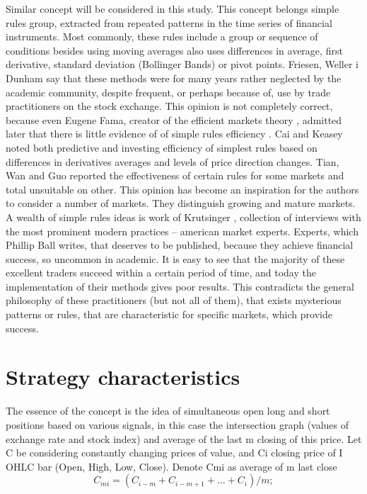 \documentclass{tewiart}
\begin{document}
Similar concept will be considered in this study. This concept belongs simple rules group, extracted from repeated patterns in the time series of financial instruments. Most commonly, these rules include a group or sequence of conditions besides using moving averages also uses differences in average, first derivative, standard deviation (Bollinger Bands) or pivot points. Friesen, Weller i Dunham \cite{friesen09} say that these methods were for many years rather neglected by the academic community, despite frequent, or perhaps because of, use by trade practitioners on the stock exchange. This opinion is not completely correct, because even Eugene Fama, creator of the efficient markets theory \cite{fama91}, admitted later that  there is little evidence of of simple rules efficiency \cite{fama98}. Cai and Keasey \cite{cai05} noted both predictive and investing efficiency of simplest rules based on differences in derivatives averages and levels of price direction changes. Tian, Wan and Guo \cite{tian02} reported the effectiveness of certain rules for some markets and total unsuitable on other. This opinion has become an inspiration for the authors to consider a number of markets. They distinguish growing and mature markets. A wealth of simple rules ideas is work of Krutsinger \cite{krutsinger99}, collection of interviews with the most prominent modern practices – american market experts. Experts, which Phillip Ball \cite{ball07} writes, that deserves to be published, because they achieve financial success, so uncommon in academic.
It is easy to see that the majority of these excellent traders succeed within a certain period of time, and today the implementation of their methods gives poor results. This contradicts the general philosophy of these practitioners (but not all of them), that exists mysterious patterns or rules, that are characteristic for specific markets, which provide success.
\section{Strategy characteristics}
\indent The essence of the concept is the idea of simultaneous open long and short positions based on various signals, in this case the intersection graph (values of exchange rate  and stock index) and average of the last m closing of this price.
Let C be considering constantly changing prices of value, and Ci closing price of I OHLC bar (Open, High, Low, Close). Denote Cmi as average of m last close
\begin{equation} \label{label-of-equation-1}
  C_{mi} = (C_{i-m} + C_{i-m+1} + … + C_{i} ) / m; 
\end{equation}
\end{document}
